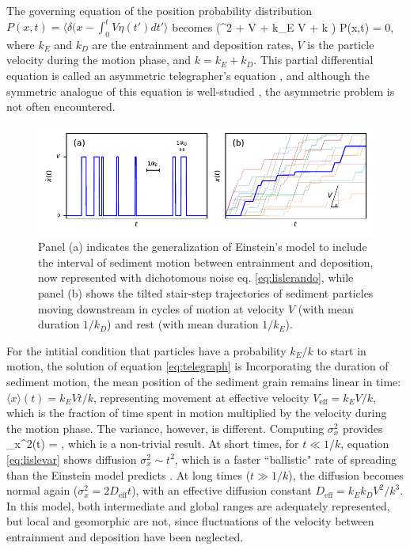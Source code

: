 The governing equation of the position probability distribution $P(x,t) = \langle \delta(x-\int_0^t V\eta(t')dt' \rangle$ becomes \citep{Balakrishnan1993}
\be \big(\pt^2 + V \px \pt + k_E V \px + k \pt \big) P(x,t) = 0,\ee
where $k_E$ and $k_D$ are the entrainment and deposition rates, $V$ is the particle velocity during the motion phase, and $k = k_E+k_D$. This partial differential equation is called an asymmetric telegrapher's equation \citep{Rossetto2018}, and although the symmetric analogue of this equation is well-studied \citep{Weiss2002a, Masoliver2017}, the asymmetric problem is not often encountered.
\begin{figure}[!htbp]
	\includegraphics[width=\linewidth,keepaspectratio]{./figures/ch1/lisleConcept.pdf}
	\caption{Panel (a) indicates the generalization of Einstein's model to include the interval of sediment motion between entrainment and deposition, now represented with dichotomous noise eq. \ref{eq:lislerando}, while panel (b) shows the tilted stair-step trajectories of sediment particles moving downstream in cycles of motion at velocity $V$ (with mean duration $1/k_D$) and rest (with mean duration $1/k_E$). }
	\label{fig:lislefig}
\end{figure}

For the intitial condition that particles have a probability $k_E/k$ to start in motion, the solution of equation \ref{eq:telegraph} is \citep{Lisle1998}
\be \ee
Incorporating the duration of sediment motion, the mean position of the sediment grain remains linear in time: $\langle x \rangle (t) = k_E V t/k$, representing movement at effective velocity $V_\text{eff} = k_E V/k$, which is the fraction of time spent in motion multiplied by the velocity during the motion phase. The variance, however, is different.
Computing $\sigma_x^2$ provides
\be \sigma_x^2(t) = ,\ee
which is a non-trivial result. At short times, for $t\ll 1/k$, equation \ref{eq:lislevar} shows diffusion $\sigma_x^2 \sim t^2$, which is a faster ``ballistic" rate of spreading than the Einstein model predicts \citep{Sokolov2014}. At long times ($t\gg 1/k$), the diffusion becomes normal again ($\sigma_x^2 = 2 D_\text{eff} t$), with an effective diffusion constant $ D_\text{eff} = k_E k_D V^2/k^3$.
In this model, both intermediate and global ranges are adequately represented, but local and geomorphic are not, since fluctuations of the velocity between entrainment and deposition have been neglected.

